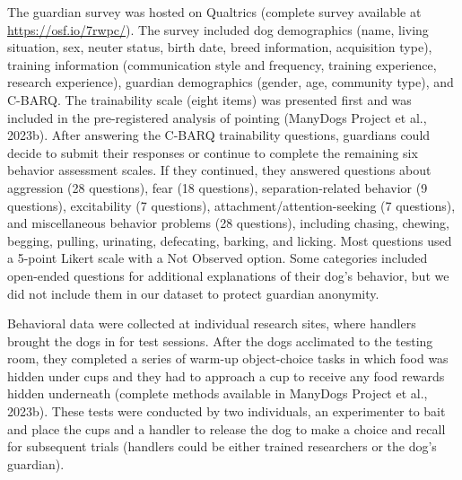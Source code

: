 \documentclass[
  pub,floatsintext]{apa6}
\begin{document}
The guardian survey was hosted on Qualtrics (complete survey available at \url{https://osf.io/7rwpc/}). The survey included dog demographics (name, living situation, sex, neuter status, birth date, breed information, acquisition type), training information (communication style and frequency, training experience, research experience), guardian demographics (gender, age, community type), and C-BARQ. The trainability scale (eight items) was presented first and was included in the pre-registered analysis of pointing (ManyDogs Project et al., 2023b). After answering the C-BARQ trainability questions, guardians could decide to submit their responses or continue to complete the remaining six behavior assessment scales. If they continued, they answered questions about aggression (28 questions), fear (18 questions), separation-related behavior (9 questions), excitability (7 questions), attachment/attention-seeking (7 questions), and miscellaneous behavior problems (28 questions), including chasing, chewing, begging, pulling, urinating, defecating, barking, and licking. Most questions used a 5-point Likert scale with a Not Observed option. Some categories included open-ended questions for additional explanations of their dog's behavior, but we did not include them in our dataset to protect guardian anonymity.

Behavioral data were collected at individual research sites, where handlers brought the dogs in for test sessions. After the dogs acclimated to the testing room, they completed a series of warm-up object-choice tasks in which food was hidden under cups and they had to approach a cup to receive any food rewards hidden underneath (complete methods available in ManyDogs Project et al., 2023b). These tests were conducted by two individuals, an experimenter to bait and place the cups and a handler to release the dog to make a choice and recall for subsequent trials (handlers could be either trained researchers or the dog's guardian).
\end{document}

